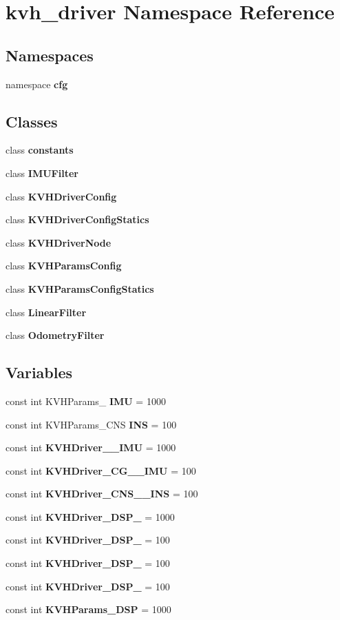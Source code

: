 \section{kvh\-\_\-driver \-Namespace \-Reference}
\label{namespacekvh__driver}
\subsection*{\-Namespaces}
\begin{DoxyCompactItemize}
\item 
namespace {\bf cfg}
\end{DoxyCompactItemize}
\subsection*{\-Classes}
\begin{DoxyCompactItemize}
\item 
class {\bf constants}
\item 
class {\bf \-I\-M\-U\-Filter}
\item 
class {\bf \-K\-V\-H\-Driver\-Config}
\item 
class {\bf \-K\-V\-H\-Driver\-Config\-Statics}
\item 
class {\bf \-K\-V\-H\-Driver\-Node}
\item 
class {\bf \-K\-V\-H\-Params\-Config}
\item 
class {\bf \-K\-V\-H\-Params\-Config\-Statics}
\item 
class {\bf \-Linear\-Filter}
\item 
class {\bf \-Odometry\-Filter}
\end{DoxyCompactItemize}
\subsection*{\-Variables}
\begin{DoxyCompactItemize}
\item 
const int \-K\-V\-H\-Params\-\_ {\bf \-I\-M\-U} = 1000
\item 
const int \-K\-V\-H\-Params\-\_\-\-C\-N\-S {\bf \-I\-N\-S} = 100
\item 
const int {\bf \-K\-V\-H\-Driver\-\_\-\_\-\-I\-M\-U} = 1000
\item 
const int {\bf \-K\-V\-H\-Driver\-\_\-\-C\-G\-\_\-\_\-\-I\-M\-U} = 100
\item 
const int {\bf \-K\-V\-H\-Driver\-\_\-\-C\-N\-S\-\_\-\_\-\-I\-N\-S} = 100
\item 
const int {\bf \-K\-V\-H\-Driver\-\_\-\-D\-S\-P\-\_} = 1000
\item 
const int {\bf \-K\-V\-H\-Driver\-\_\-\-D\-S\-P\-\_} = 100
\item 
const int {\bf \-K\-V\-H\-Driver\-\_\-\-D\-S\-P\-\_} = 100
\item 
const int {\bf \-K\-V\-H\-Driver\-\_\-\-D\-S\-P\-\_} = 100
\item 
const int {\bf \-K\-V\-H\-Params\-\_\-\-D\-S\-P} = 1000
\end{DoxyCompactItemize}


